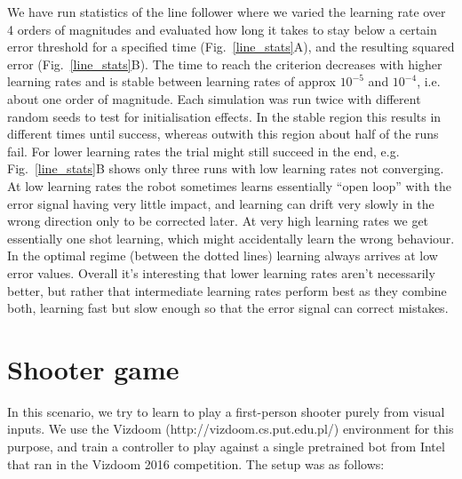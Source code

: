 \documentclass{llncs}
\begin{document}
We have run statistics of the line follower where we varied the
learning rate over 4 orders of magnitudes and evaluated how long it
takes to stay below a certain error threshold for a specified time
(Fig.~\ref{line_stats}A), and the resulting squared error
(Fig.~\ref{line_stats}B). The time to reach the criterion decreases
with higher learning rates and is stable between learning rates of
approx $10^{-5}$ and $10^{-4}$, i.e. about one order of
magnitude. Each simulation was run twice with different random seeds
to test for initialisation effects. In the stable
region this results in different times until success, whereas outwith
this region about half of the runs fail. For lower learning rates the
trial might still succeed in the end, e.g. Fig.~\ref{line_stats}B
shows only three runs with low learning rates not converging. At low
learning rates the robot sometimes learns essentially ``open loop''
with the error signal having very little impact, and learning can
drift very slowly in the wrong direction only to be corrected later.
At very high learning rates we get essentially one shot learning,
which might accidentally learn the wrong behaviour. In the
optimal regime (between the dotted lines) learning always arrives at low
error values. Overall it's interesting that lower learning rates
aren't necessarily better, but rather that intermediate learning
rates perform best as they combine both, learning fast but slow enough
so that the error signal can correct mistakes.




\section{Shooter game}
In this scenario, we try to learn to play a first-person shooter
purely from visual inputs. We use the Vizdoom
(http://vizdoom.cs.put.edu.pl/) environment for this purpose, and
train a controller to play against a single pretrained bot from Intel
that ran in the Vizdoom 2016 competition. The setup was as follows:
\end{document}
